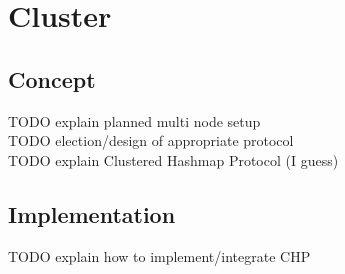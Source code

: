 \chapter{Cluster}\label{ch:cluster}
\section{Concept}
TODO explain planned multi node setup\\
TODO election/design of appropriate protocol\\
TODO explain Clustered Hashmap Protocol (I guess)\\

\section{Implementation}
TODO explain how to implement/integrate CHP

